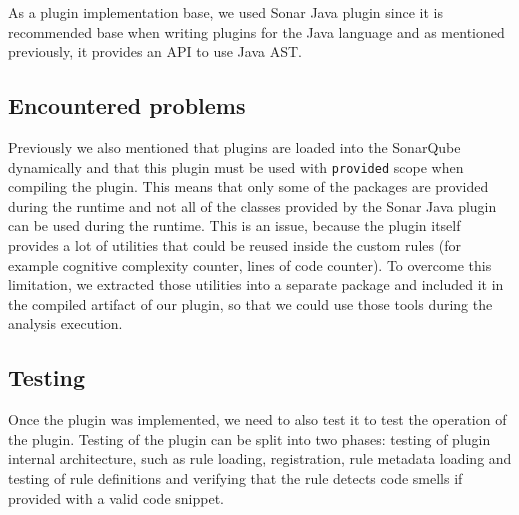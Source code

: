 As a plugin implementation base, we used Sonar Java plugin since it is recommended
base when writing plugins for the Java language and as mentioned previously, it provides
an API to use Java AST\@.

\subsection{Encountered problems}\label{subsec:encountered-problems}

Previously we also mentioned that plugins are loaded into the SonarQube dynamically and that
this plugin must be used with \verb|provided| scope when compiling the plugin.
This means that only some of the packages are provided during the runtime and not all of the classes
provided by the Sonar Java plugin can be used during the runtime.
This is an issue, because the plugin itself provides a lot of utilities that could be reused inside
the custom rules (for example cognitive complexity counter, lines of code counter).
To overcome this limitation, we extracted those utilities into a separate package and included it in
the compiled artifact of our plugin, so that we could use those tools during the analysis execution.

\subsection{Testing}\label{subsec:testing}


Once the plugin was implemented, we need to also test it to test the operation of the plugin.
Testing of the plugin can be split into two phases: testing of plugin internal architecture, such as
rule loading, registration, rule metadata loading and testing of rule definitions and verifying that
the rule detects code smells if provided with a valid code snippet.

